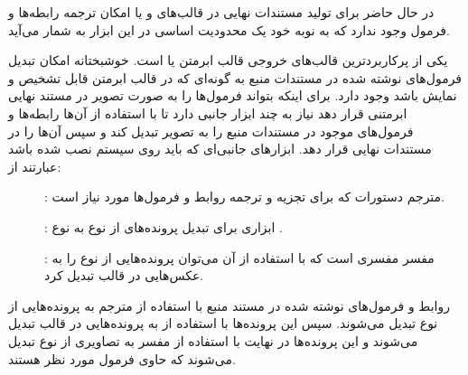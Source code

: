 \begin{note}
در حال حاضر برای تولید مستندات نهایی در قالب‌های  و یا 
امکان ترجمه رابطه‌ها و فرمول وجود ندارد که به نوبه خود یک محدودیت اساسی در این ابزار به شمار می‌آید.
\end{note}

یکی از پرکاربردترین قالب‌های خروجی قالب ابرمتن یا  است. خوشبختانه
امکان تبدیل فرمول‌های نوشته شده در مستندات منبع به گونه‌ای که در قالب ابرمتن
قابل تشخیص و نمایش باشد وجود دارد. برای اینکه  بتواند فرمول‌ها را به
صورت تصویر در مستند نهایی ابرمتنی قرار دهد نیاز به چند ابزار جانبی دارد تا با
استفاده از آن‌ها رابطه‌ها و فرمول‌های موجود در مستندات منبع را به تصویر تبدیل
کند و سپس آن‌ها را در مستندات نهایی قرار دهد. ابزارهای جانبی‌ای که باید روی
سیستم نصب شده باشد عبارتند از:

\begin{description}
 \item []:
	مترجم دستورات \lr{\LaTeX} که برای تجزیه و ترجمه روابط و فرمول‌ها مورد نیاز است. 
 \item []:
 	ابزاری برای تبدیل پرونده‌های از نوع  به نوع .
  \item []:
  مفسر  مفسری است که با استفاده از آن می‌توان پرونده‌هایی از
  نوع  را به عکس‌هایی در قالب  تبدیل کرد.
\end{description}

روابط و فرمول‌های نوشته شده در مستند منبع با استفاده از مترجم \lr{\LaTeX} به
پرونده‌هایی از نوع  تبدیل می‌شوند. سپس این پرونده‌ها با استفاده از
 به پرونده‌هایی در قالب  تبدیل می‌شوند و این پرونده‌ها
در نهایت با استفاده از مفسر  به تصاویری از نوع  تبدیل
می‌شوند که حاوی فرمول مورد نظر هستند.


